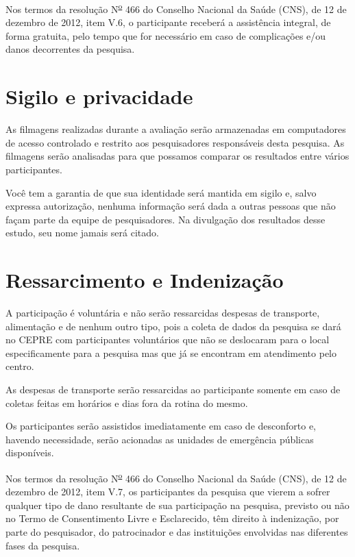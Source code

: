 \documentclass[a4paper,11pt,titlepage,singlespacing]{article}
\begin{document}
Nos termos da resolução N\textsuperscript{\underline{o}} 466 do Conselho Nacional da Saúde (CNS), de 12 de dezembro de 2012, item V.6, o participante receberá a assistência integral, de forma gratuita, pelo tempo que for necessário em caso de complicações e/ou danos decorrentes da pesquisa.


\section*{Sigilo e privacidade}

As filmagens realizadas durante a avaliação serão armazenadas em computadores de acesso controlado e restrito aos pesquisadores responsáveis desta pesquisa. As filmagens serão analisadas para que possamos comparar os resultados entre vários participantes.

Você tem a garantia de que sua identidade será mantida em sigilo e, salvo expressa autorização, nenhuma informação será dada a outras pessoas que não façam parte da equipe de pesquisadores. Na divulgação dos resultados desse estudo, seu nome jamais será citado.


\section*{Ressarcimento e Indenização}

A participação é voluntária e não serão ressarcidas despesas de transporte, alimentação e de nenhum outro tipo, pois a coleta de dados da pesquisa se dará no CEPRE com participantes voluntários que não se deslocaram para o local especificamente para a pesquisa mas que já se encontram em atendimento pelo centro.

As despesas de transporte serão ressarcidas ao participante somente em caso de coletas feitas em horários e dias fora da rotina do mesmo.

Os participantes serão assistidos imediatamente em caso de desconforto e, havendo necessidade, serão acionadas as unidades de emergência públicas disponíveis. 

Nos termos da resolução N\textsuperscript{\underline{o}} 466 do Conselho Nacional da Saúde (CNS), de 12 de dezembro de 2012, item V.7, os participantes da pesquisa que vierem a sofrer qualquer tipo de dano resultante de sua participação na pesquisa, previsto ou não no Termo de Consentimento Livre e Esclarecido, têm direito à indenização, por parte do pesquisador, do patrocinador e das instituições envolvidas nas diferentes fases da pesquisa.
\end{document}
